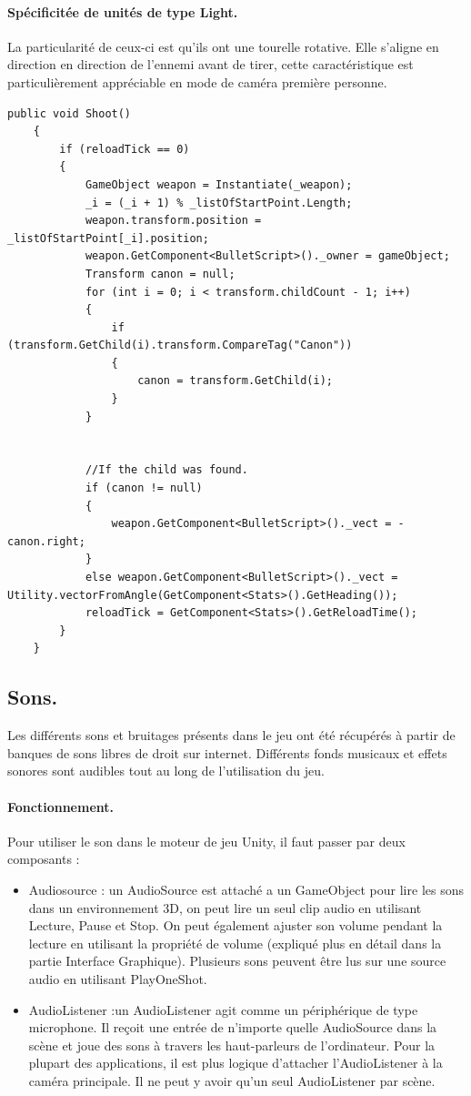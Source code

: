 \documentclass{report}
\begin{document}
\paragraph{Spécificitée de unités de type Light.} La particularité de ceux-ci est qu'ils ont une tourelle rotative. Elle s'aligne en direction en direction de l'ennemi avant de tirer, cette caractéristique est particulièrement appréciable en mode de caméra première personne.
 \begin{lstlisting}[language={[Sharp]C},label={lst:ShooterAnimation}, caption= Extrait du code de Shooter.cs]
public void Shoot()
    {
        if (reloadTick == 0)
        {
            GameObject weapon = Instantiate(_weapon);
            _i = (_i + 1) % _listOfStartPoint.Length;
            weapon.transform.position = _listOfStartPoint[_i].position;
            weapon.GetComponent<BulletScript>()._owner = gameObject;
            Transform canon = null;
            for (int i = 0; i < transform.childCount - 1; i++)
            {
                if (transform.GetChild(i).transform.CompareTag("Canon"))
                {
                    canon = transform.GetChild(i);
                }
            }


            //If the child was found.
            if (canon != null)
            {
                weapon.GetComponent<BulletScript>()._vect = -canon.right;
            }
            else weapon.GetComponent<BulletScript>()._vect = Utility.vectorFromAngle(GetComponent<Stats>().GetHeading());
            reloadTick = GetComponent<Stats>().GetReloadTime();
        }
    }
\end{lstlisting}
\subsection{Sons.}
Les différents sons et bruitages présents dans le jeu ont été récupérés à partir de banques de sons libres de droit sur internet.
\newline Différents fonds musicaux et effets sonores sont audibles tout au long de l'utilisation du jeu.
\paragraph{Fonctionnement.}
Pour utiliser le son dans le moteur de jeu Unity, il faut passer par deux composants :
\begin{itemize}
\item Audiosource : un AudioSource est attaché a un GameObject pour lire les sons dans un environnement 3D, on peut lire un seul clip audio en utilisant Lecture, Pause et Stop. On peut également ajuster son volume pendant la lecture en utilisant la propriété de volume (expliqué plus en détail dans la partie Interface Graphique). Plusieurs sons peuvent être lus sur une source audio en utilisant PlayOneShot.
\item AudioListener :un AudioListener agit comme un périphérique de type microphone. Il reçoit une entrée de n'importe quelle AudioSource dans la scène et joue des sons à travers les haut-parleurs de l'ordinateur. Pour la plupart des applications, il est plus logique d'attacher l'AudioListener à la caméra principale. Il ne peut y avoir qu'un seul AudioListener par scène.
\end{itemize}
\end{document}
